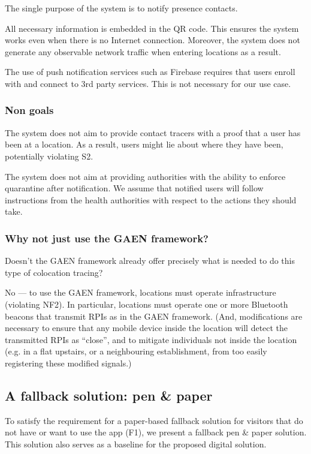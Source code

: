 The single purpose of the system is to notify presence contacts.

 All necessary information is embedded in the QR code. This ensures the system works even when there is no Internet connection. Moreover, the system does not generate any observable network traffic when entering locations as a result.

 The use of push notification services such as Firebase requires that users enroll with and connect to 3rd party services. This is not necessary for our use case.

\subsubsection{Non goals}

 The system does not aim to provide contact tracers with a proof that a user has been at a location. As a result, users might lie about where they have been, potentially violating S2.

 The system does not aim at providing authorities with the ability to enforce quarantine after notification. We assume that notified users will follow instructions from the health authorities with respect to the actions they should take.

\subsubsection{Why not just use the GAEN framework?}
Doesn’t the GAEN framework already offer precisely what is needed to do this type of colocation tracing?
 
No — to use the GAEN framework, locations must operate infrastructure (violating NF2). In particular, locations must operate one or more Bluetooth beacons that transmit RPIs as in the GAEN framework. (And, modifications are necessary to ensure that any mobile device inside the location will detect the transmitted RPIs as “close”, and to mitigate individuals not inside the location (e.g. in a flat upstairs, or a neighbouring establishment, from too easily registering these modified signals.)

\subsection{A fallback solution: pen \& paper}
To satisfy the requirement for a paper-based fallback solution for visitors that do not have or want to use the app (F1), we present a fallback pen \& paper solution. This solution also serves as a baseline for the proposed digital solution.

